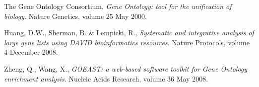 \documentclass[11pt, oneside]{article}
\begin{document}
\begin{thebibliography}{}

	The Gene Ontology Consortium, 
	\emph{Gene Ontology: tool for the unification of biology}.
	Nature Genetics, volume 25
	May 2000.

	Huang, D.W., Sherman, B. \& Lempicki, R.,
	\emph{Systematic and integrative analysis of large gene lists using DAVID bioinformatics resources}.
	Nature Protocols, volume 4
	December 2008.

	Zheng, Q., Wang, X.,
	\emph{GOEAST: a web-based software toolkit for Gene Ontology enrichment analysis}.
	Nucleic Acids Research, volume 36
	May 2008.

\end{thebibliography}
\end{document}
